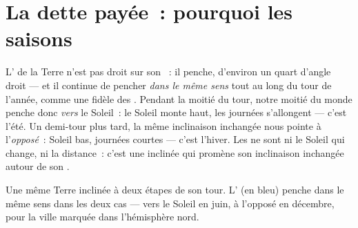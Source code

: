 \section{La dette payée~: pourquoi les saisons}

\begin{proposition}\label{prop:g6:sun-earth-moon:tilt}
L' de la Terre n'est pas droit sur son ~: il penche,
d'environ un quart d'angle droit --- et il continue de pencher
\emph{dans le même sens} tout au long du tour de l'année, comme une
fidèle  des . Pendant la moitié du tour, notre moitié
du monde penche donc \emph{vers} le Soleil~: le Soleil monte haut,
les journées s'allongent --- c'est l'été. Un demi-tour plus tard, la
même inclinaison inchangée nous pointe à l'\emph{opposé}~: Soleil
bas, journées courtes --- c'est l'hiver. Les  ne sont ni le
Soleil qui change, ni la distance~: c'est une  inclinée qui
promène son inclinaison inchangée autour de son .
\end{proposition}

\begin{omfigure}

{\small Une même Terre inclinée à deux étapes de son tour. L' (en
bleu) penche dans le même sens dans les deux cas --- vers le Soleil
en juin, à l'opposé en décembre, pour la ville marquée dans
l'hémisphère nord.}
\end{omfigure}

